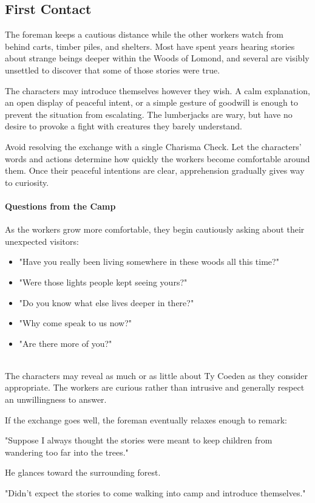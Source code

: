 \subsection*{First Contact}
{\entryfont The foreman keeps a cautious distance while the other workers watch from behind carts, timber piles, and shelters. Most have spent years hearing stories about strange beings deeper within the Woods of Lomond, and several are visibly unsettled to discover that some of those stories were true.

The characters may introduce themselves however they wish. A calm explanation, an open display of peaceful intent, or a simple gesture of goodwill is enough to prevent the situation from escalating. The lumberjacks are wary, but have no desire to provoke a fight with creatures they barely understand.

Avoid resolving the exchange with a single Charisma Check. Let the characters' words and actions determine how quickly the workers become comfortable around them. Once their peaceful intentions are clear, apprehension gradually gives way to curiosity.\\
\paragraph*{Questions from the Camp} As the workers grow more comfortable, they begin cautiously asking about their unexpected visitors:
\begin{itemize}
	\item "Have you really been living somewhere in these woods all this time?"
	\item "Were those lights people kept seeing yours?"
	\item "Do you know what else lives deeper in there?"
	\item "Why come speak to us now?"
	\item "Are there more of you?"
\end{itemize}
\hfill\\
The characters may reveal as much or as little about Ty Coeden as they consider appropriate. The workers are curious rather than intrusive and generally respect an unwillingness to answer.

If the exchange goes well, the foreman eventually relaxes enough to remark:}
\begin{DndReadAloud}
	"Suppose I always thought the stories were meant to keep children from wandering too far into the trees."

	He glances toward the surrounding forest.

	"Didn't expect the stories to come walking into camp and introduce themselves."
\end{DndReadAloud}
\eject
